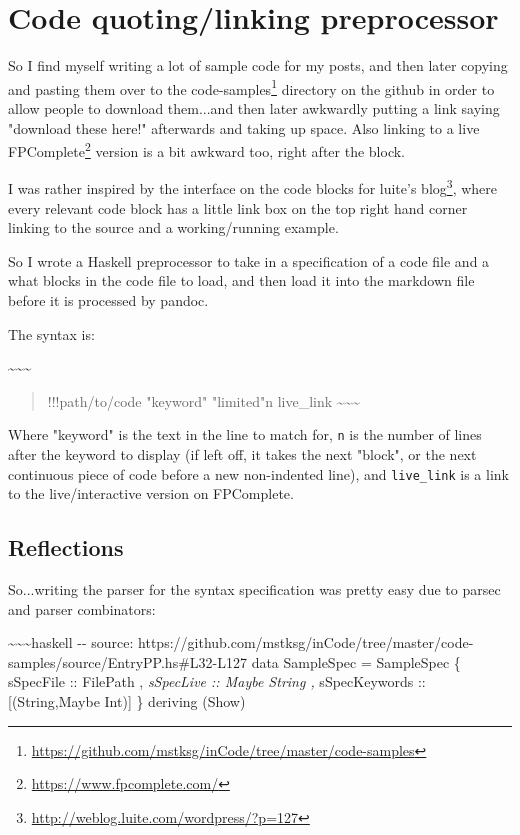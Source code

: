 \documentclass[]{article}
\renewcommand{\href}[2]{#2\footnote{\url{#1}}}
\begin{document}
\section{Code quoting/linking preprocessor}

So I find myself writing a lot of sample code for my posts, and then later
copying and pasting them over to the
\href{https://github.com/mstksg/inCode/tree/master/code-samples}{code-samples}
directory on the github in order to allow people to download them...and then
later awkwardly putting a link saying "download these here!" afterwards and
taking up space. Also linking to a live
\href{https://www.fpcomplete.com/}{FPComplete} version is a bit awkward too,
right after the block.

I was rather inspired by the interface on the code blocks for
\href{http://weblog.luite.com/wordpress/?p=127}{luite's blog}, where every
relevant code block has a little link box on the top right hand corner linking
to the source and a working/running example.

So I wrote a Haskell preprocessor to take in a specification of a code file and
a what blocks in the code file to load, and then load it into the markdown file
before it is processed by pandoc.

The syntax is:

\textasciitilde{}\textasciitilde{}\textasciitilde{}

\begin{quote}
!!!path/to/code "keyword" "limited"n live\_link
\textasciitilde{}\textasciitilde{}\textasciitilde{}
\end{quote}

Where "keyword" is the text in the line to match for, \texttt{n} is the number
of lines after the keyword to display (if left off, it takes the next "block",
or the next continuous piece of code before a new non-indented line), and
\texttt{live\_link} is a link to the live/interactive version on FPComplete.

\subsection{Reflections}

So...writing the parser for the syntax specification was pretty easy due to
parsec and parser combinators:

\textasciitilde{}\textasciitilde{}\textasciitilde{}haskell -\/- source:
https://github.com/mstksg/inCode/tree/master/code-samples/source/EntryPP.hs\#L32-L127
data SampleSpec = SampleSpec \{ sSpecFile :: FilePath , \emph{sSpecLive :: Maybe
String , }sSpecKeywords :: {[}(String,Maybe Int){]} \} deriving (Show)
\end{document}
